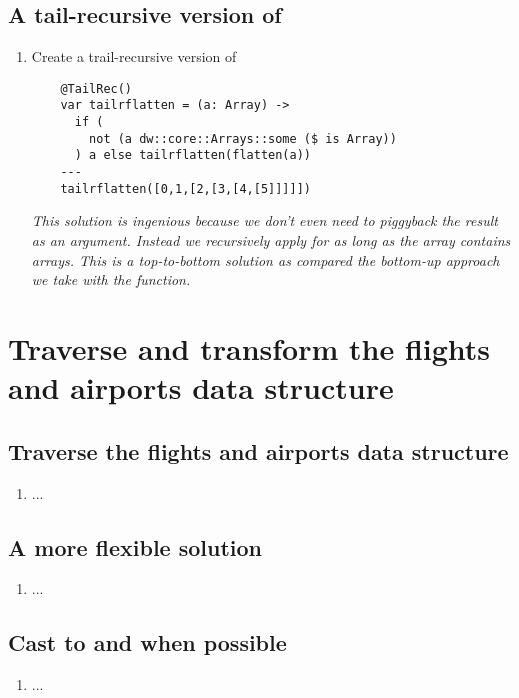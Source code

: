 \subsection{A tail-recursive version of }
\begin{enumerate}[resume*]
\item Create a trail-recursive version of 
  \begin{lstlisting}
    @TailRec()
    var tailrflatten = (a: Array) -> 
      if ( 
        not (a dw::core::Arrays::some ($ is Array))
      ) a else tailrflatten(flatten(a))
    ---
    tailrflatten([0,1,[2,[3,[4,[5]]]]])
  \end{lstlisting}
  \emph{
    This solution is ingenious because we don't even need to piggyback the result as an argument.  Instead we recursively apply  for as long as the array contains arrays.  This  is a top-to-bottom solution as compared the bottom-up approach we take with the  function.
  }
\end{enumerate}


\section{Traverse and transform the flights and airports data structure}

\subsection{Traverse the flights and airports data structure}
\begin{enumerate}[resume*]
\item ...
\end{enumerate}

\subsection{A more flexible solution}
\begin{enumerate}[resume*]
\item ...
\end{enumerate}

\subsection{Cast to  and  when possible}
\begin{enumerate}[resume*]
\item ...
\end{enumerate}
